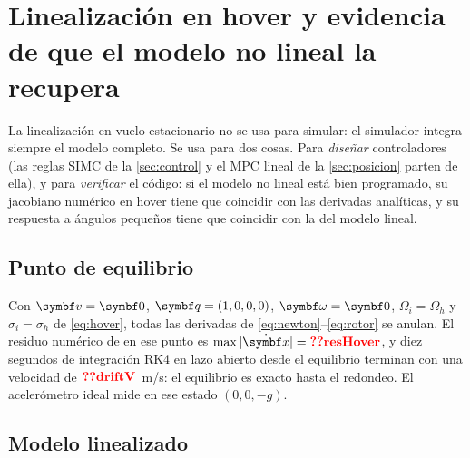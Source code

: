 \section{Linealización en hover y evidencia de que el modelo no lineal la recupera}
\label{sec:linealizacion}

La linealización en vuelo estacionario no se usa para simular: el
simulador integra siempre el modelo completo. Se usa para dos cosas. Para
\emph{diseñar} controladores (las reglas SIMC de la \cref{sec:control} y el
MPC lineal de la \cref{sec:posicion} parten de ella), y para \emph{verificar}
el código: si el modelo no lineal está bien programado, su jacobiano numérico
en hover tiene que coincidir con las derivadas analíticas, y su respuesta a
ángulos pequeños tiene que coincidir con la del modelo lineal.

\subsection{Punto de equilibrio}

Con $\vect v=\vect0$, $\vect q=(1,0,0,0)$, $\vect\omega=\vect 0$,
$\Omega_i=\Omega_h$ y $\sigma_i=\sigma_h$ de \eqref{eq:hover}, todas las
derivadas de \eqref{eq:newton}--\eqref{eq:rotor} se anulan. El residuo
numérico de  en ese punto es $\max|\dot{\vect x}|=\val{resHover}$,
y diez segundos de integración RK4 en lazo abierto desde el equilibrio
terminan con una velocidad de $\val{driftV}$~m/s: el equilibrio es exacto
hasta el redondeo. El acelerómetro ideal mide en ese estado $(0,0,-g)$.

\subsection{Modelo linealizado}

